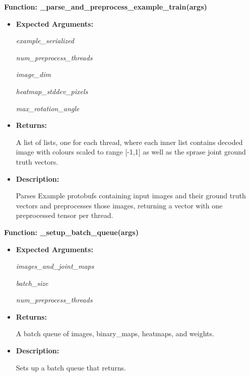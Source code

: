 \documentclass{scrreprt}
\begin{document}
\textbf{Function: \_parse\_and\_preprocess\_example\_train(args)}
\begin{itemize}
    \item \textbf{Expected Arguments:}

            \quad\textit{example\_serialized}

            \quad\textit{num\_preprocess\_threads}

            \quad\textit{image\_dim}

            \quad\textit{heatmap\_stddev\_pixels}

            \quad\textit{max\_rotation\_angle}

    \item \textbf{Returns:}

            A list of lists, one for each thread, where each inner list contains decoded image with colours scaled to range [-1,1] as well as the sprase joint ground truth vectors.

    \item \textbf{Description:}

            Parses Example protobufs containing input images and their ground truth vectors and preprocesses those images, returning a vector with one preprocessed tensor per thread.

\end{itemize}

\textbf{Function: \_setup\_batch\_queue(args)}
\begin{itemize}
    \item \textbf{Expected Arguments:}

            \quad\textit{images\_and\_joint\_maps}

            \quad\textit{batch\_size}

            \quad\textit{num\_preprocess\_threads}

    \item \textbf{Returns:}

            A batch queue of images, binary\_maps, heatmaps, and weights.

    \item \textbf{Description:}

            Sets up a batch queue that returns.

\end{itemize}
\end{document}
